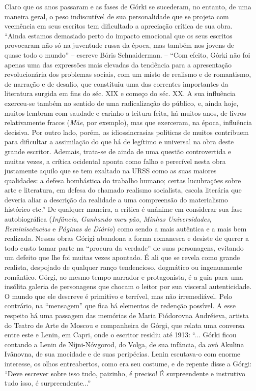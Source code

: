 Claro que os anos passaram e as fases de Górki se sucederam, no entanto,
de uma maneira geral, o peso indiscutível de sua personalidade que se
projeta com veemência em seus escritos tem dificultado a apreciação
crítica de sua obra. ``Ainda estamos demasiado perto do impacto
emocional que os seus escritos provocaram não só na juventude russa da
época, mas também nos jovens de quase todo o mundo'' -- escreve Bóris
Schnaiderman. -- ``Com efeito, Górki não foi apenas uma das expressões
mais elevadas da tendência para a apresentação revolucionária dos
problemas sociais, com um misto de realismo e de romantismo, de narração
e de desafio, que constituiu uma das correntes importantes da literatura
surgida em fins do séc. XIX e começo do séc. XX. A sua influência
exerceu-se também no sentido de uma radicalização do público, e, ainda
hoje, muitos lembram com saudade e carinho a leitura feita, há muitos
anos, de livros relativamente fracos (\emph{Mãe}, por exemplo), mas que
exerceram, na época, influência decisiva. Por outro lado, porém, as
idiossincrasias políticas de muitos contribuem para dificultar a
assimilação do que há de legítimo e universal na obra deste grande
escritor. Ademais, trata-se de ainda de uma questão controvertida e
muitas vezes, a crítica ocidental aponta como falho e perecível nesta
obra justamente aquilo que se tem exaltado na URSS como as suas maiores
qualidades: a defesa bombástica do trabalho humano; certas lucubrações
sobre arte e literatura, em defesa do chamado realismo socialista,
escola literária que deveria aliar a descrição da realidade a uma
compreensão do materialismo histórico etc.'' De qualquer maneira, a
crítica é unânime em considerar sua fase autobiográfica
(\emph{Infância}, \emph{Ganhando meu pão}, \emph{Minhas Universidades},
\emph{Reminiscências} e \emph{Páginas de Diário}) como sendo a mais
autêntica e a mais bem realizada. Nessas obras Górigi abandona a forma
romanesca e desiste de querer a todo custo tomar parte na ``procura da
verdade'' de suas personagens, evitando um defeito que lhe foi muitas
vezes apontado. É ali que se revela como grande realista, despojado de
qualquer ranço tendencioso, dogmático ou ingenuamente romântico. Górgi,
ao mesmo tempo narrador e protagonista, é a guia para uma insólita
galeria de personagens que chocam o leitor por sua visceral
autenticidade. O mundo que ele descreve é primitivo e terrível, mas não
irremediável. Pelo contrário, na ``mensagem'' que fica há elementos de
redenção possível. A esse respeito há uma passagem das memórias de Maria
Fiódorovna Andréieva, artista do Teatro de Arte de Moscou e companheira
de Górgi, que relata uma conversa entre este e Lenin, em Capri, onde o
escritor residiu até 1913: ``... Górki ficou contando a Lenin de
Níjni-Nóvgorod, do Volga, de sua infância, da avó Akulina Ivânovna, de
sua mocidade e de suas peripécias. Lenin escutava-o com enorme
interesse, os olhos entreabertos, como era seu costume, e de repente
disse a Górgi: ``Deve escrever sobre isso tudo, paizinho, é preciso! É
surpreendente e instrutivo tudo isso, é surpreendente...''

